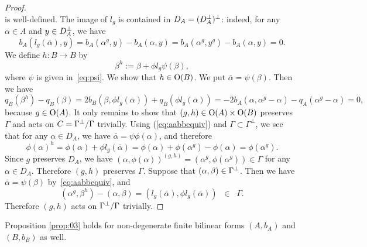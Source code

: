 \documentclass{amsart}
\numberwithin{procedure}{section}
\begin{document}
\begin{proof}
\[\]
is well-defined. The image of $l_g$ is contained in $D_A=(D_A\sp{\perp})\sp{\perp}$: 
indeed,
for any $\alpha\in A$ and $y\in D_A\sp{\perp}$, we have
\[
b_A(l_g(\bar{\alpha}), y)=b_A(\alpha^g, y)-b_A(\alpha, y)=b_A(\alpha^g, y^g)-b_A(\alpha, y)=0.
\]
We define $h: B\to B$ by
\[
\beta^h:=\beta+\phi l_g \psi (\beta),
\]
where $\psi$ is given in~\eqref{eq:psi}. 
We show that  $h\in \mathord{\mathrm{O}}(B)$.
We put $\bar{\alpha}=\psi(\beta)$.
Then we have 
%
\[
q_B(\beta^h)-q_B(\beta) = 2b_B(\beta, \phi l_g (\bar{\alpha}))+q_B(\phi l_g(\bar{\alpha}))= 
 -2b_A(\alpha, \alpha^g-\alpha)-q_A( \alpha^g-\alpha)=0,
\]
%
because $g\in \mathord{\mathrm{O}}(A)$.
It only remains to show that $(g, h)\in \mathord{\mathrm{O}}(A)\times \mathord{\mathrm{O}}(B)$ preserves $\Gamma$ and acts on
$C=\Gamma\sp{\perp}/\Gamma$ trivially.
Using (\ref{eq:aabbequiv}) and $\Gamma \subset \Gamma^\perp$,
 we see that for any $\alpha\in D_A$, we have $\bar{\alpha} =\psi\phi (\alpha)$, and therefore
\[
\phi (\alpha)^h=\phi (\alpha)+\phi l_g (\bar{\alpha})=\phi (\alpha)+\phi(\alpha^g)-\phi (\alpha)=\phi(\alpha^g).
\]
Since $g$ preserves $D_A$, we have $(\alpha, \phi(\alpha))^{(g, h)}=(\alpha^g, \phi(\alpha^g))\in \Gamma$
for any $\alpha\in D_A$.
Therefore $(g, h)$ preserves $\Gamma$.
Suppose that $(\alpha, \beta)\in \Gamma\sp{\perp}$.
Then we have $\bar{\alpha} =\psi(\beta)$ by~\eqref{eq:aabbequiv}, and 
\[
(\alpha^g, \beta^h)-(\alpha, \beta)=(l_g(\bar{\alpha}), \phi l_g(\bar{\alpha}) )\;\; \in \;\; \Gamma.
\]
Therefore $(g, h)$ acts on
$\Gamma\sp{\perp}/\Gamma$ trivially.
\end{proof}
\begin{remark}
 Proposition \ref{prop:03} holds for 
 non-degenerate finite bilinear forms $(A, b_A)$ and $(B, b_B)$
 as well.
\end{remark}
%
\end{document}
